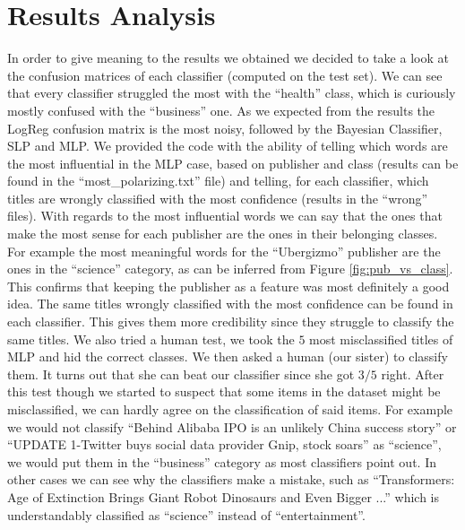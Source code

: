 \documentclass[10pt,a4paper]{report}
\begin{document}
\section{Results Analysis}
In order to give meaning to the results we obtained we decided to take a look at the confusion matrices of each classifier (computed on the test set). We can see that every classifier struggled the most with the \enquote{health} class, which is curiously mostly confused with the \enquote{business} one. As we expected from the results the LogReg confusion matrix is the most noisy, followed by the Bayesian Classifier,  SLP and MLP. We provided the code with the ability of telling which words are the most influential in the MLP case, based on publisher and class (results can be found in the \enquote{most\_polarizing.txt} file) and telling, for each classifier, which titles are wrongly classified with the most confidence (results in the \enquote{wrong} files). With regards to the most influential words we can say that the ones that make the most sense for each publisher are the ones in their belonging classes. For example the most meaningful words for the \enquote{Ubergizmo} publisher are the ones in the \enquote{science} category, as can be inferred from Figure \ref{fig:pub_vs_class}. This confirms that keeping the publisher as a feature was most definitely a good idea. The same titles wrongly classified with the most confidence can be found in each classifier. This gives them more credibility since they struggle to classify the same titles. We also tried a human test, we took the $5$ most misclassified titles of MLP and hid the correct classes. We then asked a human (our sister) to classify them. It turns out that she can beat our classifier since she got $3/5$ right. After this test though we started to suspect that some items in the dataset might be misclassified, we can hardly agree on the classification of said items. For example we would not classify \enquote{Behind Alibaba IPO is an unlikely China success story} or \enquote{UPDATE 1-Twitter buys social data provider Gnip, stock soars} as \enquote{science}, we would put them in the \enquote{business} category as most classifiers point out. In other cases we can see why the classifiers make a mistake, such as \enquote{Transformers: Age of Extinction Brings Giant Robot Dinosaurs and Even Bigger  ...} which is understandably classified as \enquote{science} instead of \enquote{entertainment}.     
\end{document}

